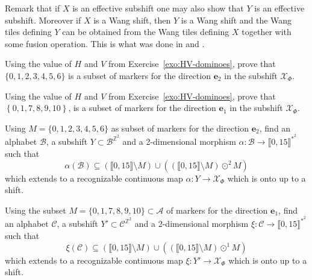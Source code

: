 \documentclass[12pt]{amsart}
\newtheorem{remark}[definition]{Remark}
\newcommand{\N}{\mathbb{N}}
\newcommand{\Z}{\mathbb{Z}}
\newcommand{\be}{{\boldsymbol{e}}}
\newcommand{\Acal}{\mathcal{A}} %
\newcommand{\Bcal}{\mathcal{B}}
\newcommand{\Ccal}{\mathcal{C}}
\newcommand{\Xcal}{\mathcal{X}} %
\newcommand{\Zrange}[1]{\llbracket0,#1\rrbracket}
\begin{document}
    Remark that if $X$ is an effective subshift
    one may also show that $Y$ is an effective subshift.
    Moreover if $X$ is a Wang shift, then $Y$ is a Wang shift
    and the Wang tiles defining $Y$ can be obtained from the Wang tiles
    defining $X$ together with some fusion operation. This is what was done in
    \cite{MR3978536} and \cite{MR4226493}.



\begin{exo}[label={exo:marker-e2-in-XPhi}]
    Using the value of $H$ and $V$ from Exercise~\ref{exo:HV-dominoes}, prove that
    $\{0,1,2,3,4,5,6\}$ is a subset of markers for the direction $\be_2$ in
    the subshift $\Xcal_\Phi$.
\end{exo}


\begin{exo}[label={exo:marker-e1-in-XPhi}]
    Using the value of $H$ and $V$ from Exercise~\ref{exo:HV-dominoes}, prove that
    $\left\{0, 1, 7, 8, 9, 10\right\}$, 
    is a subset of markers for the direction $\be_1$ in the subshift
    $\Xcal_\Phi$.
\end{exo}


\begin{exo}[label={exo:markers-find-a-subshift}]
    Using $M=\{0,1,2,3,4,5,6\}$ as subset of markers for the direction $\be_2$,
    find an alphabet $\Bcal$, a subshift $Y\subset\Bcal^{\Z^2}$ and 
    a 2-dimensional morphism $\alpha:\Bcal\to\Zrange{15}^{*^2}$ 
    such that
    \begin{equation*}
        \alpha(\Bcal)
        \subseteq (\Zrange{15}\setminus M)
        \cup \left((\Zrange{15}\setminus M)\odot^2 M\right)
    \end{equation*}
    which extends to a recognizable continuous map $\alpha:Y\to\Xcal_\Phi$ which is
    onto up to a shift.
\end{exo}


\begin{exo}[label={exo:desubstitute-markers-e1}]
    Using the subset $M=\{0, 1, 7, 8, 9, 10\}\subset\Acal$ 
    of markers for the direction $\be_1$,
    find an alphabet $\Ccal$, a subshift $Y'\subset\Ccal^{\Z^2}$ and 
    a 2-dimensional morphism $\xi:\Ccal\to\Zrange{15}^{*^2}$ 
    such that
    \begin{equation*}
        \xi(\Ccal)
        \subseteq (\Zrange{15}\setminus M)
        \cup \left((\Zrange{15}\setminus M)\odot^1 M\right)
    \end{equation*}
    which extends to a recognizable continuous map $\xi:Y'\to\Xcal_\Phi$ which is
    onto up to a shift.
\end{exo}
\end{document}
